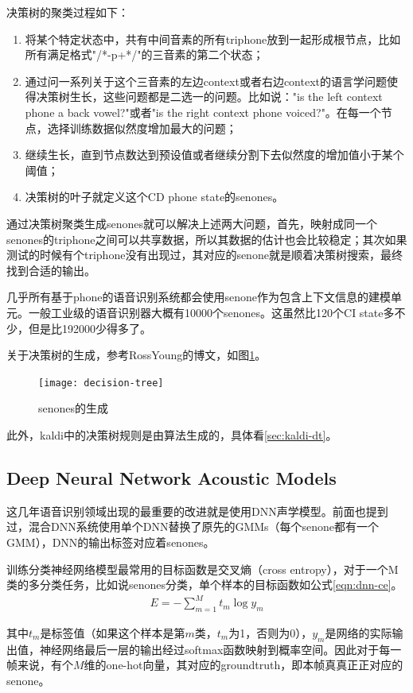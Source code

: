 决策树的聚类过程如下：
\begin{enumerate}
  \item 将某个特定状态中，共有中间音素的所有triphone放到一起形成根节点，比如所有满足格式"/*-p+*/"的三音素的第二个状态；
  \item 通过问一系列关于这个三音素的左边context或者右边context的语言学问题使得决策树生长，这些问题都是二选一的问题。比如说："is the left context phone a back vowel?"或者"is the right context phone voiced?"。在每一个节点，选择训练数据似然度增加最大的问题；
  \item 继续生长，直到节点数达到预设值或者继续分割下去似然度的增加值小于某个阈值；
  \item 决策树的叶子就定义这个CD phone state的senones。
\end{enumerate}

通过决策树聚类生成senones就可以解决上述两大问题，首先，映射成同一个senones的triphone之间可以共享数据，所以其数据的估计也会比较稳定；其次如果测试的时候有个triphone没有出现过，其对应的senone就是顺着决策树搜索，最终找到合适的输出。


几乎所有基于phone的语音识别系统都会使用senone作为包含上下文信息的建模单元。一般工业级的语音识别器大概有10000个senones。这虽然比120个CI state多不少，但是比192000少得多了。

关于决策树的生成，参考RossYoung的博文，如图\ref{fig:decision-tree}。
\begin{figure}[htbp]
  \centering
  \texttt{[image: decision-tree]}
  \caption{senones的生成\label{fig:decision-tree}}
\end{figure}

此外，kaldi中的决策树规则是由算法生成的，具体看\ref{sec:kaldi-dt}。

\subsection{Deep Neural Network Acoustic Models} 
这几年语音识别领域出现的最重要的改进就是使用DNN声学模型。前面也提到过，混合DNN系统使用单个DNN替换了原先的GMMs（每个senone都有一个GMM），DNN的输出标签对应着senones。

训练分类神经网络模型最常用的目标函数是交叉熵（cross entropy），对于一个M类的多分类任务，比如说senones分类，单个样本的目标函数如公式\ref{eqn:dnn-ce}。
\begin{align}
\label{eqn:dnn-ce}
E = -\sum_{m=1}^{M} t_m\log{y_m}
\end{align}

其中$t_m$是标签值（如果这个样本是第$m$类，$t_m$为1，否则为0），$y_m$是网络的实际输出值，神经网络最后一层的输出经过softmax函数映射到概率空间。因此对于每一帧来说，有个$M$维的one-hot向量，其对应的groundtruth，即本帧真真正正对应的senone。


